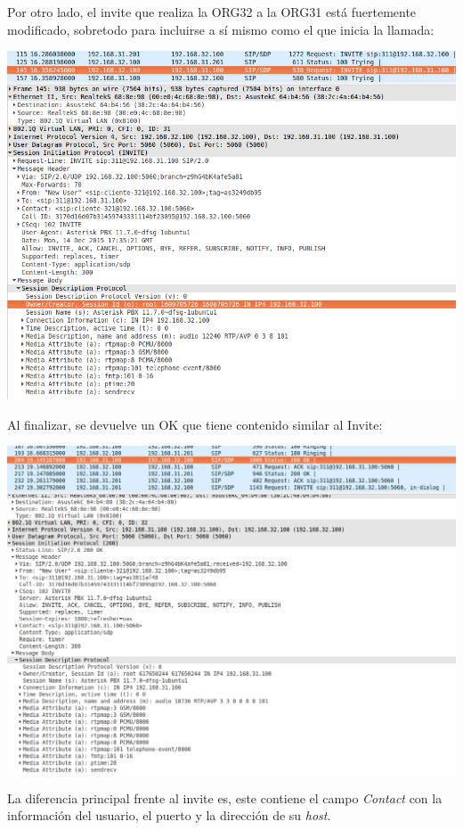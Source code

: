 \documentclass[]{article}
\begin{document}
Por otro lado, el invite que realiza la ORG32 a la ORG31 está fuertemente modificado, sobretodo para incluirse a sí mismo como el que inicia la llamada:

\begin{center}
	\includegraphics[width=1\linewidth]{images/voip9}
\end{center}

Al finalizar, se devuelve un OK que tiene contenido similar al Invite:

\begin{center}
	\includegraphics[width=1\linewidth]{images/voip10}
\end{center}

La diferencia principal frente al invite es, este contiene el campo \textit{Contact} con la información del usuario, el puerto y la dirección de su \textit{host}.
  
\end{document}
